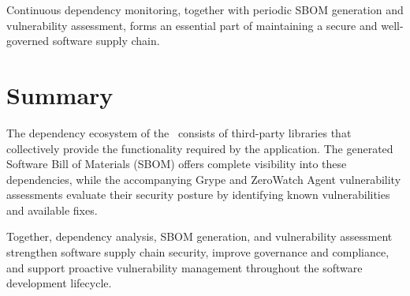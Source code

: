 Continuous dependency monitoring, together with periodic SBOM generation and vulnerability assessment, forms an essential part of maintaining a secure and well-governed software supply chain.

\vspace{0.4cm}


\section{Summary}

The dependency ecosystem of the \ProjectName\ consists of third-party libraries that collectively provide the functionality required by the application. The generated Software Bill of Materials (SBOM) offers complete visibility into these dependencies, while the accompanying Grype and ZeroWatch Agent vulnerability assessments evaluate their security posture by identifying known vulnerabilities and available fixes.

Together, dependency analysis, SBOM generation, and vulnerability assessment strengthen software supply chain security, improve governance and compliance, and support proactive vulnerability management throughout the software development lifecycle.